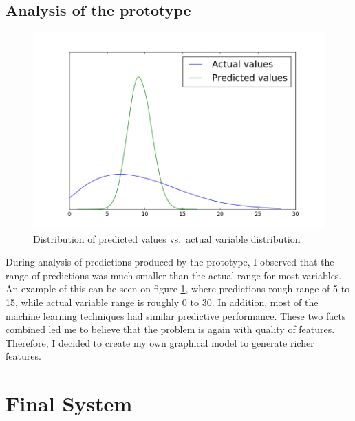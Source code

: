\documentclass[12pt,a4paper]{book}
\begin{document}
\subsection{Analysis of the prototype}
\begin{figure}[ht]
\centering
\includegraphics[scale=0.5]{predicted_assists}
\caption{Distribution of predicted values vs.\ actual variable distribution}
\label{fig:variablerange}
\end{figure}
During analysis of predictions produced by the prototype, I observed that the range of predictions was much smaller than the actual range for most variables.
An example of this can be seen on figure \ref{fig:variablerange}, where predictions rough range of 5 to 15, while actual variable range is roughly 0 to 30.
In addition, most of the machine learning techniques had similar predictive performance.
These two facts combined led me to believe that the problem is again with quality of features.
Therefore, I decided to create my own graphical model to generate richer features.
\section{Final System}
\end{document}
